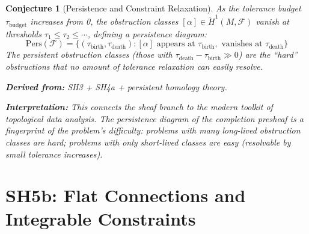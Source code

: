 \documentclass[11pt,letterpaper]{article}
\newtheorem{conjecture}{Conjecture}[section]
\newcommand{\tbudget}{\tau_{\mathrm{budget}}}
\newcommand{\Hcech}{\check{H}}
\newcommand{\sheaf}{\mathcal{F}}
\begin{document}
\begin{conjecture}[Persistence and Constraint 
Relaxation]\label{conj:persistence}
As the tolerance budget $\tbudget$ increases from 0, the obstruction 
classes $[\alpha] \in \Hcech^1(M, \sheaf)$ vanish at thresholds 
$\tau_1 \leq \tau_2 \leq \cdots$, defining a \emph{persistence 
diagram}:
\begin{equation}\label{eq:persistence}
    \mathrm{Pers}(\sheaf) = \{(\tau_{\mathrm{birth}}, 
    \tau_{\mathrm{death}}) : [\alpha] \text{ appears at } 
    \tau_{\mathrm{birth}}, \text{ vanishes at } \tau_{\mathrm{death}}\}
\end{equation}
The \emph{persistent obstruction classes} (those with 
$\tau_{\mathrm{death}} - \tau_{\mathrm{birth}} \gg 0$) are the 
``hard'' obstructions that no amount of tolerance relaxation can 
easily resolve.

\textbf{Derived from:} SH3 + SH4a + persistent homology theory.

\textbf{Interpretation:} This connects the sheaf branch to the 
modern toolkit of topological data analysis. The persistence diagram 
of the completion presheaf is a fingerprint of the problem's 
difficulty: problems with many long-lived obstruction classes are 
hard; problems with only short-lived classes are easy (resolvable by 
small tolerance increases).
\end{conjecture}

\section{SH5b: Flat Connections and Integrable Constraints}
\end{document}

